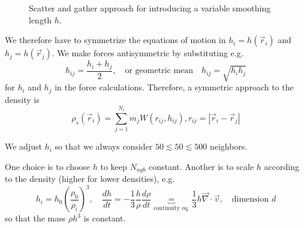 \begin{figure}[!htb]
 \centering
 \hfill
 \caption{Scatter and gather approach for introducing a variable smoothing length $h$.}
 \label{fig:scatter_gather}
\end{figure}


We therefore have to symmetrize the equations of motion in $h_i = h(\vec{r}_i)$ and $h_j = h(\vec{r}_j)$.
We make forces antisymmetric by substituting e.g.
\begin{equation}
    h_{ij} = \frac{h_i + h_j}{2}, \quad \text{or geometric mean} \quad h_{ij} = \sqrt{h_i h_j}
\end{equation}
for $h_i$ and $h_j$ in the force calculations.
Therefore, a symmetric approach to the density is
\begin{equation}
    \rho_s\left(\vec{r}_i\right)=\sum_{j=1}^{N_i} m_j W\left(r_{i j}, h_{i j}\right), r_{i j}=\left|\vec{r}_i-\vec{r}_j\right|
\end{equation}


We adjust $h_i$ so that we always consider $50 \lesssim 50 \lesssim 500$ neighbors.

One choice is to choose $h$ to keep $N_{ngb}$ constant. Another
is to scale $h$ according to the density (higher for lower densities), e.g.
\begin{equation}
    h_i = h_0 \left( \frac{\rho_0}{\rho_i} \right)^3, \quad \frac{dh}{dt} = - \frac{1}{3} \frac{h}{\rho} \frac{d\rho}{dt} \underbrace{=}_{\text{continuity eq.}} \frac{1}{3} h \vec{\nabla} \cdot \vec{v}, \quad \text{dimension } d
\end{equation}
so that the mass $\rho h^3$ is constant.

